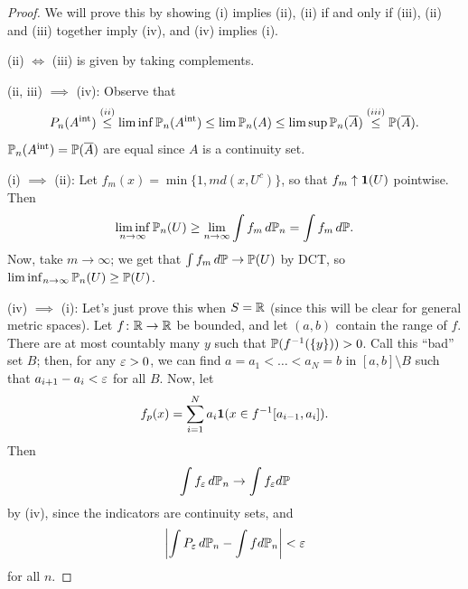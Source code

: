 \begin{proof}
    We will prove this by showing (i) implies (ii), (ii) if and only if (iii), (ii) and (iii) together imply (iv), and (iv) implies (i).

    (ii) $\iff$ (iii) is given by taking complements.

    (ii, iii) $\implies$ (iv): Observe that
    \[ P_n(A^{\text{int}}) \stackrel{(ii)}{\leq} \liminf \mathbb P_n(A^{\text{int}}) \leq \lim \mathbb P_n(A) \leq \limsup \mathbb P_n(\overline A) \stackrel{(iii)}{\leq} \mathbb P(\overline A). \]
    $\mathbb P_n(A^\text{int}) = \mathbb P(\overline A)$ are equal since $A$ is a continuity set.

    (i) $\implies$ (ii): Let $f_m(x) = \min\{1, m d(x, U^c)\}$, so that $f_m \uparrow \mathbf 1(U)$ pointwise. Then
    \[ \liminf_{n \to \infty} \mathbb P_n(U) \geq \lim_{n \to \infty} \int f_m \, d\mathbb P_n = \int f_m \, d\mathbb P. \]
    Now, take $m \to \infty$; we get that $\int f_m \, d\mathbb P \to \mathbb P(U)$ by DCT, so $\liminf_{n \to \infty} \mathbb P_n(U) \geq \mathbb P(U)$.

    (iv) $\implies$ (i): Let's just prove this when $S = \mathbb R$ (since this will be clear for general metric spaces). Let $f \colon \mathbb R \to \mathbb R$ be bounded, and let $(a, b)$ contain the range of $f$. There are at most countably many $y$ such that $\mathbb P(f^{-1}(\{y\})) > 0$. Call this ``bad'' set $B$; then, for any $\varepsilon > 0$, we can find $a = a_1 < \dots < a_N = b$ in $[a, b] \setminus B$ such that $a_{i+1} - a_i < \varepsilon$ for all $B$. Now, let
    \[ f_p(x) = \sum_{i=1}^N a_i \mathbf 1(x \in f^{-1}[a_{i-1}, a_i]). \]
    Then
    \[ \int f_\varepsilon \, d\mathbb P_n \to \int f_\varepsilon d\mathbb P \]
    by (iv), since the indicators are continuity sets, and
    \[ \left\lvert \int P_\varepsilon \, d\mathbb P_n - \int f d \mathbb P_n \right\rvert < \varepsilon \]
    for all $n$. 
\end{proof}
